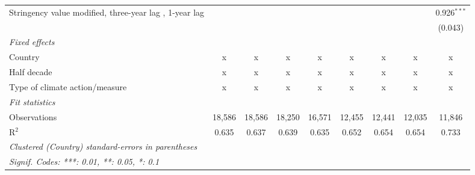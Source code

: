\begin{table}[htbp]
\begin{tabular}{lcccccccc}
      Stringency value modified, three-year lag , 1-year lag                     &               &               &                &              &               &               &               & 0.926$^{***}$\\   
                                                                                 &               &               &                &              &               &               &               & (0.043)\\   
      \emph{Fixed effects}\\
      Country                                                                    & x             & x             & x              & x            & x             & x             & x             & x\\  
      Half decade                                                                & x             & x             & x              & x            & x             & x             & x             & x\\  
      Type of climate action/measure                                             & x             & x             & x              & x            & x             & x             & x             & x\\  
      \midrule \emph{Fit statistics}\\
      Observations                                                               & 18,586        & 18,586        & 18,250         & 16,571       & 12,455        & 12,441        & 12,035        & 11,846\\  
      R$^2$                                                                      & 0.635         & 0.637         & 0.639          & 0.635        & 0.652         & 0.654         & 0.654         & 0.733\\  
      \midrule
      \multicolumn{9}{l}{\emph{Clustered (Country) standard-errors in parentheses}}\\
      \multicolumn{9}{l}{\emph{Signif. Codes: ***: 0.01, **: 0.05, *: 0.1}}\\
   \end{tabular}
\end{table}


